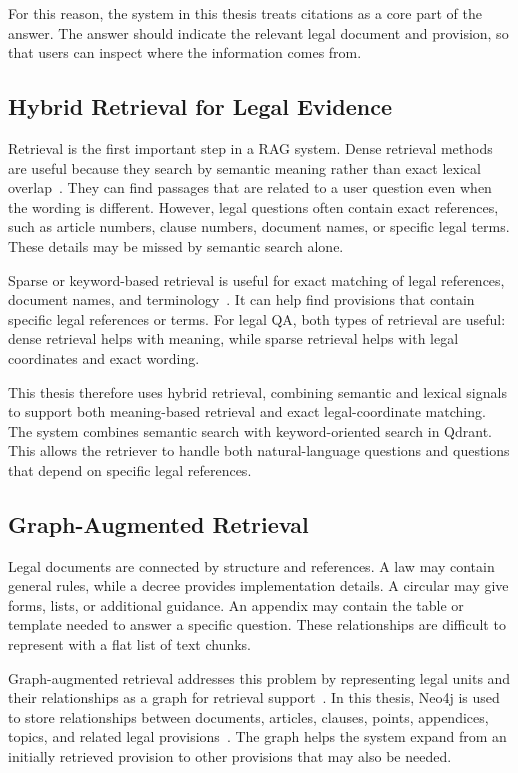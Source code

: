 For this reason, the system in this thesis treats citations as a core part of the answer. The answer should indicate the relevant legal document and provision, so that users can inspect where the information comes from.

\subsection{Hybrid Retrieval for Legal Evidence}
Retrieval is the first important step in a RAG system. Dense retrieval methods are useful because they search by semantic meaning rather than exact lexical overlap~\cite{karpukhin2020dense,reimers2019sentencebert}. They can find passages that are related to a user question even when the wording is different. However, legal questions often contain exact references, such as article numbers, clause numbers, document names, or specific legal terms. These details may be missed by semantic search alone.

Sparse or keyword-based retrieval is useful for exact matching of legal references, document names, and terminology~\cite{robertson2009probabilistic}. It can help find provisions that contain specific legal references or terms. For legal QA, both types of retrieval are useful: dense retrieval helps with meaning, while sparse retrieval helps with legal coordinates and exact wording.

This thesis therefore uses hybrid retrieval, combining semantic and lexical signals to support both meaning-based retrieval and exact legal-coordinate matching. The system combines semantic search with keyword-oriented search in Qdrant. This allows the retriever to handle both natural-language questions and questions that depend on specific legal references.

\subsection{Graph-Augmented Retrieval}
Legal documents are connected by structure and references. A law may contain general rules, while a decree provides implementation details. A circular may give forms, lists, or additional guidance. An appendix may contain the table or template needed to answer a specific question. These relationships are difficult to represent with a flat list of text chunks.

Graph-augmented retrieval addresses this problem by representing legal units and their relationships as a graph for retrieval support~\cite{edge2024graphrag}. In this thesis, Neo4j is used to store relationships between documents, articles, clauses, points, appendices, topics, and related legal provisions~\cite{neo4jdocs}. The graph helps the system expand from an initially retrieved provision to other provisions that may also be needed.

